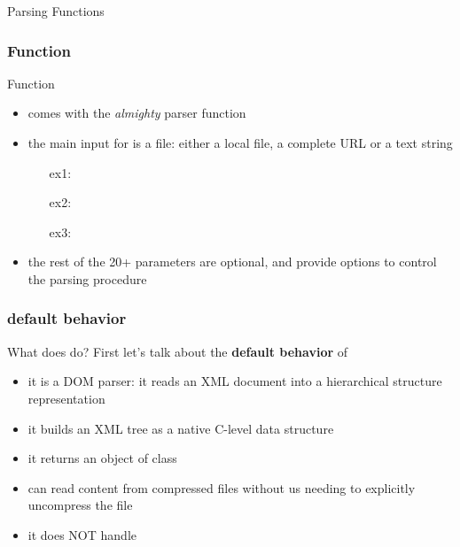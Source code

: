 \documentclass{beamer}\usepackage[]{graphicx}\usepackage[]{color}
\begin{document}
\begin{frame}
 \begin{center}
  {\Huge \textcolor{mandarina}{Parsing Functions}}
 \end{center}
\end{frame}


\begin{frame}
\frametitle{Function }

\begin{block}{Function }
\begin{itemize}
\item {} comes with the \textit{almighty} parser function 
 \item the main input for  is a file: either a local file, a complete URL or a text string
 \begin{itemize}
 \item[ex1:] 
 \item[ex2:] 
 \item[ex3:] 
 \end{itemize}
 \item the rest of the 20+ parameters are optional, and provide options to control the parsing procedure
\end{itemize}
\end{block}

\end{frame}


\begin{frame}[fragile]
\frametitle{ default behavior}

\begin{block}{What does  do?}
First let's talk about the \textbf{default behavior} of  
\begin{itemize}
 \item it is a DOM parser: it reads an XML document into a hierarchical structure representation
 \item it builds an XML tree as a native C-level data structure \\
 \item it returns an object of class 
 \item can read content from compressed files without us needing to explicitly uncompress the file
 \item it does NOT handle  
\end{itemize}
\end{block}

\end{frame}
\end{document}
